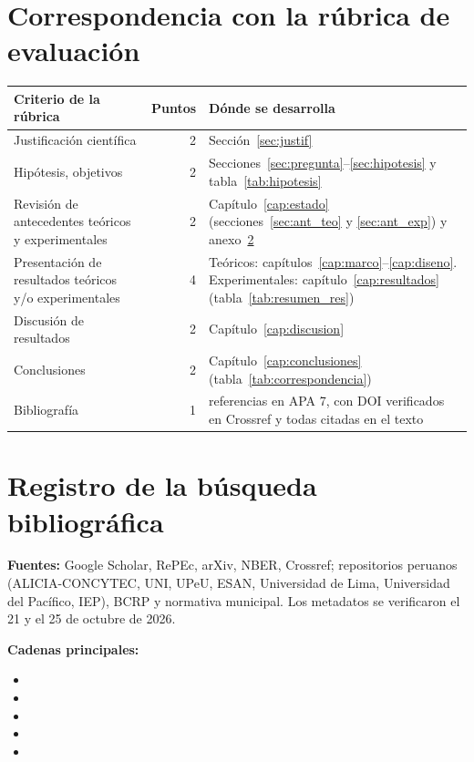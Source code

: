 \chapter{Correspondencia con la rúbrica de evaluación}\label{anx:rubrica}

\begin{table}[H]
\centering\small
\begin{tabularx}{\textwidth}{>{\raggedright\arraybackslash}p{4.4cm}r>{\raggedright\arraybackslash}X}
\toprule
Criterio de la rúbrica & Puntos & Dónde se desarrolla \\
\midrule
Justificación científica & 2 & Sección~\ref{sec:justif} \\
Hipótesis, objetivos & 2 & Secciones~\ref{sec:pregunta}--\ref{sec:hipotesis} y tabla~\ref{tab:hipotesis} \\
Revisión de antecedentes teóricos y experimentales & 2 & Capítulo~\ref{cap:estado} (secciones~\ref{sec:ant_teo} y \ref{sec:ant_exp}) y anexo~\ref{anx:busqueda} \\
Presentación de resultados teóricos y/o experimentales & 4 & Teóricos: capítulos~\ref{cap:marco}--\ref{cap:diseno}. Experimentales: capítulo~\ref{cap:resultados} (tabla~\ref{tab:resumen_res}) \\
Discusión de resultados & 2 & Capítulo~\ref{cap:discusion} \\
Conclusiones & 2 & Capítulo~\ref{cap:conclusiones} (tabla~\ref{tab:correspondencia}) \\
Bibliografía & 1 & 44 referencias en APA 7, con DOI verificados en Crossref y todas citadas en el texto \\
\bottomrule
\end{tabularx}
\end{table}

\chapter{Registro de la búsqueda bibliográfica}\label{anx:busqueda}

\textbf{Fuentes:} Google Scholar, RePEc, arXiv, NBER, Crossref; repositorios peruanos (ALICIA-CONCYTEC, UNI, UPeU, ESAN, Universidad de Lima, Universidad del Pacífico, IEP), BCRP y normativa municipal. Los metadatos se verificaron el 21 y el 25 de octubre de 2026.

\textbf{Cadenas principales:}
\begin{itemize}[itemsep=0pt]
\item {}
\item {}
\item {}
\item {}
\item {}
\end{itemize}

